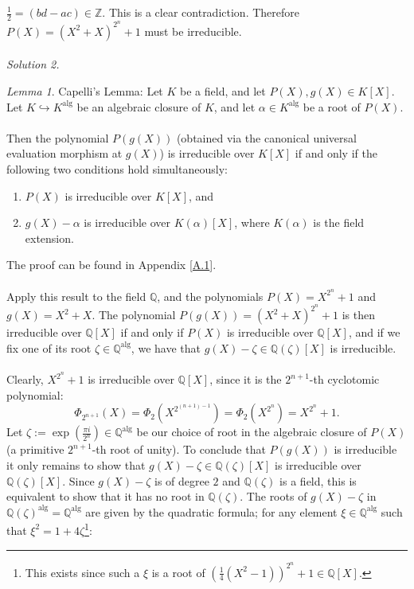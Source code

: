 \documentclass[11pt, a4paper, oneside]{article}
\theoremstyle{remark}
\theoremstyle{lemma}
\newtheorem*{lemma}{Lemma}
\begin{document}
\(\frac{1}{2} = \left( bd - ac \right) \in \mathbb{Z}\). This is a clear contradiction. Therefore \(P(X)=\left(X^2+X\right)^{2^n}+1\) must be irreducible.
\\\\
\textit{Solution 2.}
\begin{lemma}{Capelli's Lemma:}  
Let \( K \) be a field, and let \( P(X), g(X) \in K[X] \). Let \( K \hookrightarrow K^{\text{alg}} \) be an algebraic closure of \( K \), and let \( \alpha \in K^{\text{alg}} \) be a root of \( P(X) \).  
\\\\
Then the polynomial \( P\left( g(X) \right) \) (obtained via the canonical universal evaluation morphism at \( g(X) \)) is irreducible over \( K[X] \) if and only if the following two conditions hold simultaneously:
\begin{enumerate}
    \item \( P(X) \) is irreducible over \( K[X] \), and
    \item \( g(X) - \alpha \) is irreducible over \( K(\alpha)[X] \), where \( K(\alpha) \) is the field extension.
\end{enumerate}
\end{lemma}
The proof can be found in Appendix [\hyperref[A.1]{A.1}].  
\\\\
Apply this result to the field \( \mathbb{Q} \), and the polynomials \( P(X) = X^{2^{n}} + 1 \) and \( g(X) = X^2 + X \). The polynomial \( P\left( g(X) \right) = \left( X^2 + X \right)^{2^n} + 1 \) is then irreducible over \( \mathbb{Q}[X] \) if and only if \( P(X) \) is irreducible over \( \mathbb{Q}[X] \), and if we fix one of its root \( \zeta \in \mathbb{Q}^{\mathrm{alg}} \), we have that \( g(X) - \zeta \in \mathbb{Q}(\zeta)[X] \) is irreducible.
\\\\
Clearly, \( X^{2^n} + 1 \) is irreducible over \( \mathbb{Q}[X] \), since it is the \( 2^{n+1} \)-th cyclotomic polynomial:
\[
\Phi_{2^{n+1}}(X) = \Phi_{2}\left( X^{2^{(n+1)-1}} \right) = \Phi_{2}\left( X^{2^{n}} \right) = X^{2^{n}} + 1.
\]
Let \( \zeta := \exp\left( \frac{\pi i}{2^{n}} \right) \in \mathbb{Q}^{\text{alg}} \) be our choice of root in the algebraic closure of \( P(X) \) (a primitive \( 2^{n+1} \)-th root of unity). To conclude that \(P\left( g(X) \right)\) is irreducible it only remains to show that \( g(X) - \zeta \in \mathbb{Q}(\zeta)[X] \) is irreducible over \( \mathbb{Q}(\zeta)[X] \). Since \( g(X) - \zeta \) is of degree \( 2 \) and \(\mathbb{Q}(\zeta)\) is a field, this is equivalent to show that it has no root in \( \mathbb{Q}(\zeta) \). The roots of \( g(X) - \zeta \) in \( \mathbb{Q}(\zeta)^{\text{alg}} = \mathbb{Q}^{\text{alg}} \) are given by the quadratic formula; for any element \( \xi \in \mathbb{Q}^{\text{alg}} \) such that \( \xi^2 = 1 + 4\zeta \)\footnote{This exists since such a \( \xi \) is a root of \( \left( \frac{1}{4}(X^2 - 1) \right)^{2^n} + 1 \in \mathbb{Q}[X] \).}:
\end{document}

